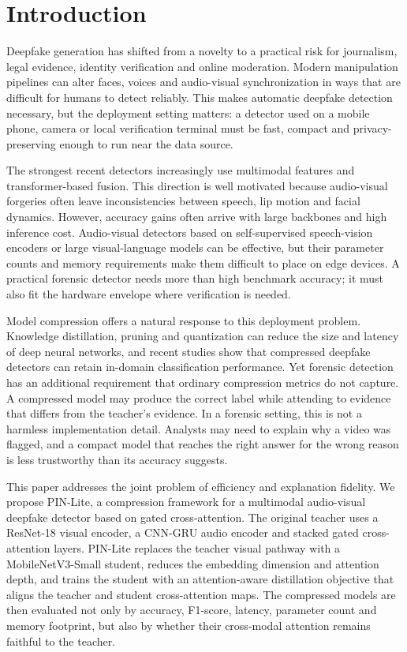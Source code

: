 \documentclass[pdflatex,sn-basic,Numbered]{sn-jnl}
\begin{document}
\maketitle

\section{Introduction}\label{sec:introduction}

Deepfake generation has shifted from a novelty to a practical risk for journalism, legal evidence, identity verification and online moderation. Modern manipulation pipelines can alter faces, voices and audio-visual synchronization in ways that are difficult for humans to detect reliably. This makes automatic deepfake detection necessary, but the deployment setting matters: a detector used on a mobile phone, camera or local verification terminal must be fast, compact and privacy-preserving enough to run near the data source.

The strongest recent detectors increasingly use multimodal features and transformer-based fusion. This direction is well motivated because audio-visual forgeries often leave inconsistencies between speech, lip motion and facial dynamics. However, accuracy gains often arrive with large backbones and high inference cost. Audio-visual detectors based on self-supervised speech-vision encoders or large visual-language models can be effective, but their parameter counts and memory requirements make them difficult to place on edge devices. A practical forensic detector needs more than high benchmark accuracy; it must also fit the hardware envelope where verification is needed.

Model compression offers a natural response to this deployment problem. Knowledge distillation, pruning and quantization can reduce the size and latency of deep neural networks, and recent studies show that compressed deepfake detectors can retain in-domain classification performance. Yet forensic detection has an additional requirement that ordinary compression metrics do not capture. A compressed model may produce the correct label while attending to evidence that differs from the teacher's evidence. In a forensic setting, this is not a harmless implementation detail. Analysts may need to explain why a video was flagged, and a compact model that reaches the right answer for the wrong reason is less trustworthy than its accuracy suggests.

This paper addresses the joint problem of efficiency and explanation fidelity. We propose PIN-Lite, a compression framework for a multimodal audio-visual deepfake detector based on gated cross-attention. The original teacher uses a ResNet-18 visual encoder, a CNN-GRU audio encoder and stacked gated cross-attention layers. PIN-Lite replaces the teacher visual pathway with a MobileNetV3-Small student, reduces the embedding dimension and attention depth, and trains the student with an attention-aware distillation objective that aligns the teacher and student cross-attention maps. The compressed models are then evaluated not only by accuracy, F1-score, latency, parameter count and memory footprint, but also by whether their cross-modal attention remains faithful to the teacher.
\end{document}
